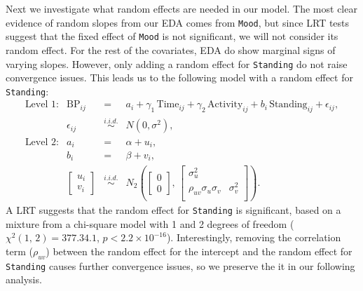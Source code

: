 \documentclass[12pt,twoside,letterpaper]{article}
\theoremstyle{definition}
\theoremstyle{definition}
\begin{document}
Next we investigate what random effects are needed in our model. The most clear evidence of random slopes from our EDA comes from \texttt{Mood}, but since LRT tests suggest that the fixed effect of \texttt{Mood} is not significant, we will not consider its random effect. For the rest of the covariates, EDA do show marginal signs of varying slopes. However, only adding a random effect for \texttt{Standing} do not raise convergence issues. This leads us to the following model with a random effect for \texttt{Standing}:
\begin{equation}\label{eq: RIS stand}
    \begin{array}{rrcll}
        \text{Level 1}: & \text{BP}_{ij} &=& a_i + \gamma_1\, \text{Time}_{ij} + \gamma_2\, \text{Activity}_{ij} + b_i\, \text{Standing}_{ij} + \epsilon_{ij}, \\[0.5ex]
         & \epsilon_{ij} &\overset{i.i.d.}{\sim}& N(0, \sigma^2), \\[0.5ex]
        \text{Level 2}: & a_i &=& \alpha + u_i, \\[0.5ex]
         & b_i &=& \beta + v_i, \\[1ex]
         & \begin{bmatrix} u_i \\ v_i 
         \end{bmatrix} &\overset{i.i.d.}{\sim}& N_2\left(\begin{bmatrix} 0 \\ 0 \end{bmatrix},\, \begin{bmatrix} \sigma_u^2 &\\ 
         \rho_{uv}\sigma_u\sigma_v & \sigma_v^2\\
         \end{bmatrix} \right).
    \end{array}
\end{equation}
A LRT suggests that the random effect for \texttt{Standing} is significant, based on a mixture from a chi-square model with 1 and 2 degrees of freedom ($\chi^2 (1,\, 2) = 377.34.1$, $p < 2.2 \times 10^{-16}$). Interestingly, removing the correlation term ($\rho_{uv}$) between the random effect for the intercept and the random effect for \texttt{Standing} causes further convergence issues, so we preserve the it in our following analysis.
\end{document}

